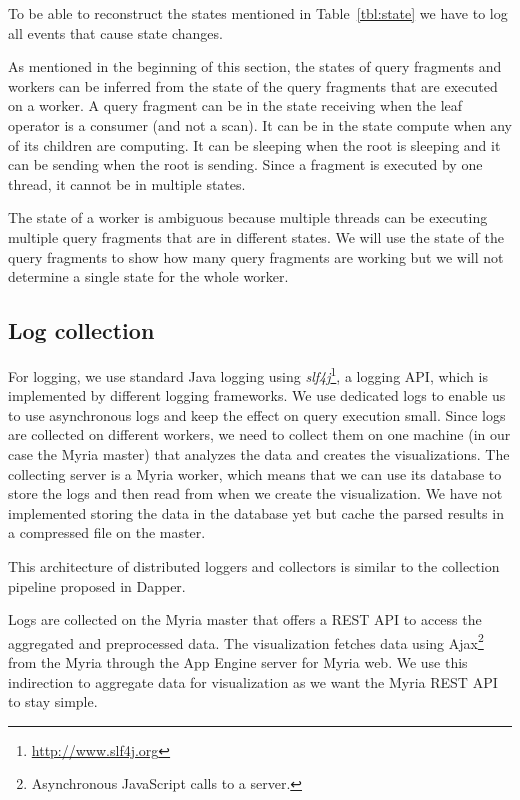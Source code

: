 \documentclass[11pt]{scrartcl}
\begin{document}
To be able to reconstruct the states mentioned in Table~\ref{tbl:state} we have to log all events that cause state changes.

As mentioned in the beginning of this section, the states of query fragments and workers can be inferred from the state of the query fragments that are executed on a worker. A query fragment can be in the state receiving when the leaf operator is a consumer (and not a scan). It can be in the state compute when any of its children are computing. It can be sleeping when the root is sleeping and it can be sending when the root is sending. Since a fragment is executed by one thread, it cannot be in multiple states.

The state of a worker is ambiguous because multiple threads can be executing multiple query fragments that are in different states. We will use the state of the query fragments to show how many query fragments are working but we will not determine a single state for the whole worker.


\subsection{Log collection}
\label{sec:collect}

For logging, we use standard Java logging using \emph{slf4j}\footnote{\url{http://www.slf4j.org}}, a logging API, which is implemented by different logging frameworks. We use dedicated logs to enable us to use asynchronous logs and keep the effect on query execution small. Since logs are collected on different workers, we need to collect them on one machine (in our case the Myria master) that analyzes the data and creates the visualizations. The collecting server is a Myria worker, which means that we can use its database to store the logs and then read from when we create the visualization. We have not implemented storing the data in the database yet but cache the parsed results in a compressed file on the master.

This architecture of distributed loggers and collectors is similar to the collection pipeline proposed in Dapper\cite{sigelman2010dapper}.

Logs are collected on the Myria master that offers a REST API to access the aggregated and preprocessed data. The visualization fetches data using Ajax\footnote{Asynchronous JavaScript calls to a server.} from the Myria through the App Engine server for Myria web. We use this indirection to aggregate data for visualization as we want the Myria REST API to stay simple.
\end{document}
